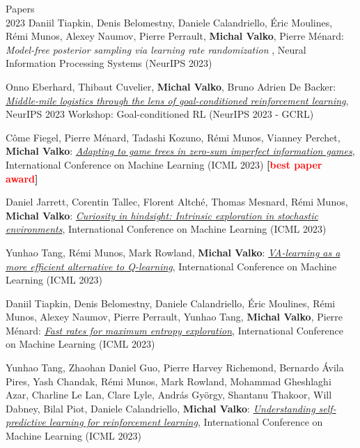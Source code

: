 \documentclass{resume}
\begin{document}
\begin{category}{Papers\\2023}
\citembullet
Daniil Tiapkin, Denis Belomestny, Daniele Calandriello, \' Eric Moulines, R\' emi Munos, Alexey Naumov,  Pierre Perrault, {\bf Michal Valko}, Pierre M\' enard: 
\emph{Model-free posterior sampling via learning rate randomization}%
,
Neural Information Processing Systems
({\sf NeurIPS 2023}) 


\citembullet
Onno Eberhard, Thibaut Cuvelier, {\bf Michal Valko}, Bruno Adrien De Backer:
\href{https://openreview.net/pdf?id=l8iK6YqgkR}{\emph{Middle-mile logistics through the lens of goal-conditioned reinforcement learning}},
NeurIPS 2023 Workshop: Goal-conditioned RL
({\sf NeurIPS 2023 - GCRL}) 


\citembullet
C\^ome Fiegel, Pierre M\' enard, Tadashi Kozuno, R\' emi Munos, Vianney Perchet,  {\bf Michal Valko}:
\href{https://arxiv.org/pdf/2212.12567}{\emph{Adapting to game trees in zero-sum imperfect information games}},
International Conference on Machine Learning
({\sf ICML 2023}) 
{\bf [\textcolor{red}{best paper award}]}


\citembullet
Daniel Jarrett, Corentin Tallec, Florent Altch\'e, Thomas Mesnard, R\'emi Munos, {\bf Michal Valko}:
\href{https://arxiv.org/pdf/2206.08332.pdf}
{\emph{Curiosity in hindsight: Intrinsic exploration in stochastic environments}},
International Conference on Machine Learning
({\sf ICML 2023}) 

\citembullet
Yunhao Tang, R\' emi Munos, Mark Rowland,  {\bf Michal Valko}: 
\href{https://arxiv.org/pdf/2305.18161.pdf}
{\emph{VA-learning as a more efficient alternative to Q-learning}}, 
International Conference on Machine Learning
({\sf ICML 2023}) 

\citembullet
Daniil Tiapkin, Denis Belomestny, Daniele Calandriello, \' Eric Moulines, R\' emi Munos, Alexey Naumov,  Pierre Perrault, Yunhao Tang, {\bf Michal Valko}, Pierre M\' enard: 
\href{https://arxiv.org/abs/2303.08059.pdf} 
{\emph{Fast rates for maximum entropy exploration}},
International Conference on Machine Learning
({\sf ICML 2023}) 



\citembullet
Yunhao Tang, Zhaohan Daniel Guo, Pierre Harvey Richemond, Bernardo \'Avila Pires, Yash Chandak, R\'emi Munos, Mark Rowland, Mohammad Gheshlaghi Azar, Charline Le Lan, Clare Lyle, Andr\'as Gy\"orgy, Shantanu Thakoor, Will Dabney, Bilal Piot, Daniele Calandriello, {\bf Michal Valko}:
\href{https://arxiv.org/pdf/2205.14211.pdf}
{\emph{Understanding self-predictive learning for reinforcement learning}},
International Conference on Machine Learning
({\sf ICML 2023}) 


\end{category}
\end{document}
